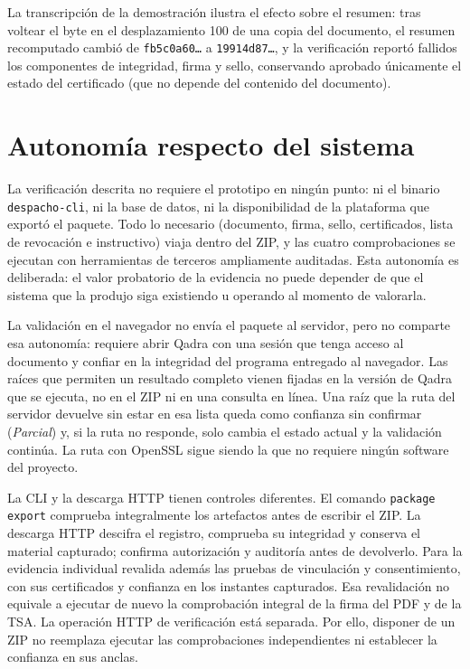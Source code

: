 La transcripción de la demostración ilustra el efecto sobre el resumen: tras voltear el byte en el desplazamiento 100 de una copia del documento, el resumen recomputado cambió de \texttt{fb5c0a60\ldots} a \texttt{19914d87\ldots}, y la verificación reportó fallidos los componentes de integridad, firma y sello, conservando aprobado únicamente el estado del certificado (que no depende del contenido del documento).

\section{Autonomía respecto del sistema}\label{sec:verificacion-autonomia}

La verificación descrita no requiere el prototipo en ningún punto: ni el binario \texttt{despacho-cli}, ni la base de datos, ni la disponibilidad de la plataforma que exportó el paquete. Todo lo necesario (documento, firma, sello, certificados, lista de revocación e instructivo) viaja dentro del ZIP, y las cuatro comprobaciones se ejecutan con herramientas de terceros ampliamente auditadas. Esta autonomía es deliberada: el valor probatorio de la evidencia no puede depender de que el sistema que la produjo siga existiendo u operando al momento de valorarla.

La validación en el navegador no envía el paquete al servidor, pero no comparte esa autonomía: requiere abrir Qadra con una sesión que tenga acceso al documento y confiar en la integridad del programa entregado al navegador. Las raíces que permiten un resultado completo vienen fijadas en la versión de Qadra que se ejecuta, no en el ZIP ni en una consulta en línea. Una raíz que la ruta del servidor devuelve sin estar en esa lista queda como confianza sin confirmar (\emph{Parcial}) y, si la ruta no responde, solo cambia el estado actual y la validación continúa. La ruta con OpenSSL sigue siendo la que no requiere ningún software del proyecto.

La CLI y la descarga HTTP tienen controles diferentes. El comando
\texttt{package export} comprueba integralmente los artefactos antes de escribir
el ZIP. La descarga HTTP descifra el registro, comprueba su integridad y conserva
el material capturado; confirma autorización y auditoría antes de devolverlo.
Para la evidencia individual revalida además las pruebas de vinculación y
consentimiento, con sus certificados y confianza en los instantes capturados.
Esa revalidación no equivale a ejecutar de nuevo la comprobación integral de la
firma del PDF y de la TSA. La operación HTTP de verificación está separada.
Por ello, disponer de un ZIP no reemplaza ejecutar las comprobaciones
independientes ni establecer la confianza en sus anclas.

